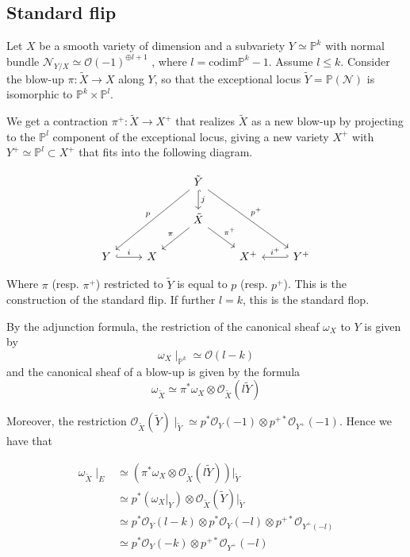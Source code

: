 \subsection{Standard flip}

Let $X$ be a smooth variety of dimension and a subvariety $Y \simeq \mathbb{P}^k$ with normal bundle $\mathcal{ N}_{Y/X}\simeq \mathcal{O}(-1)^{\oplus l+1}$ , where  $l = \mathrm{codim}\mathbb{P}^{k}-1$. Assume $l \leq k$. Consider the blow-up $\pi:\tilde{X}\to X$ along $Y$, so that the exceptional locus $\tilde{Y} = \mathbb{P}(\mathcal{N})$ is isomorphic to $\mathbb{P}^{k}\times \mathbb{P}^l$. 

We get a contraction $\pi^{+}: \tilde{X}\to X^+$ that realizes $\tilde{X}$ as a new blow-up by projecting to the $\mathbb{P}^{l}$ component of the exceptional locus, giving a new variety $X^+$ with $Y^{+}\simeq \mathbb{P}^{l}\subset X^{+}$ that fits into the following diagram. 

\[\begin{tikzcd}
	&& {\tilde Y} \\
	& {} & {\tilde X} \\
	Y & X && {X^+} & {Y^+}
	\arrow["{i^+}"', hook', from=3-5, to=3-4]
	\arrow["i", hook, from=3-1, to=3-2]
	\arrow["\pi"', from=2-3, to=3-2]
	\arrow["{\pi^+}", from=2-3, to=3-4]
	\arrow["j", hook, from=1-3, to=2-3]
	\arrow["p"', from=1-3, to=3-1]
	\arrow["{p^+}", from=1-3, to=3-5]
\end{tikzcd}\]

Where $\pi$ (resp. $\pi^+$) restricted to $\tilde{Y}$ is equal to $p$ (resp. $p^+$). This is the construction of the standard flip. If further $l = k$, this is the standard flop. 

By the adjunction formula, the restriction of the canonical sheaf $\omega_X$ to $Y$ is given by $$
\omega_{X}\mid_{\mathbb{P}^{k}} \simeq \mathcal{O}(l-k)$$ and the canonical sheaf of a blow-up is given by the formula $$\omega_{\tilde{X}} \simeq \pi^{*}\omega_{X}\otimes \mathcal{O}_{\tilde{X}}(l \tilde{Y})$$

Moreover, the restriction $\mathcal{O}_{\tilde{X}}(\tilde{Y}) \mid_{\tilde{Y}} \simeq p^{*}\mathcal{O}_{Y}(-1)\otimes p^{+*}\mathcal{O}_{Y^+}(-1)$. Hence we have that 

\begin{align*}
\omega_{\tilde{X}}\mid_{E} &\simeq \left( \pi^{*}\omega_{X}\otimes \mathcal{O}_{\tilde{X}}(l \tilde{Y}) \right) \Big|_{\tilde{Y}}  \\
&\simeq p^{*}(\omega_{X}\big|_{Y})\otimes  \mathcal{O}_{\tilde{X}}( \tilde{Y})\Big|_{\tilde{Y}}  \\
&\simeq p^{*} \mathcal{O}_Y(l-k) \otimes p^{*}\mathcal{O}_{Y}(-l) \otimes p^{+*}\mathcal{O}_{Y^{+}(-l)} \\
&\simeq p^{*} \mathcal{O}_Y(-k) \otimes p^{+*}\mathcal{O}_{Y^+}(-l) 
\end{align*}

